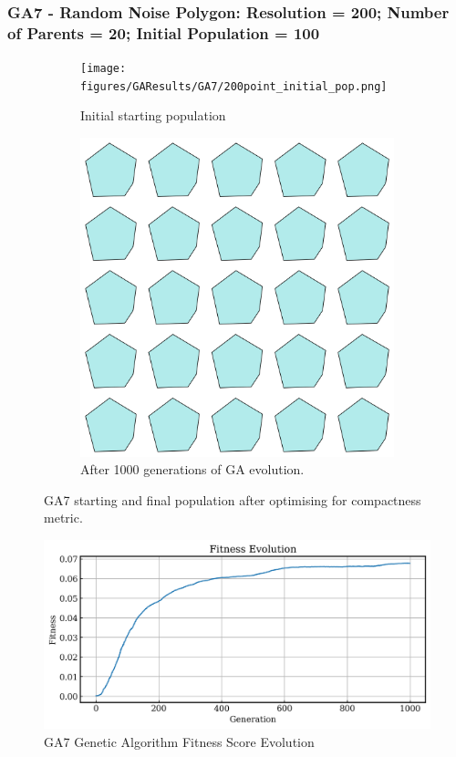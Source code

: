 \documentclass{article}
\begin{document}
\subsubsection*{GA7 - Random Noise Polygon: Resolution = 200; Number of Parents = 20; Initial Population = 100}

\begin{figure}[H]
    \centering
    \begin{subfigure}[b]{0.45\textwidth}
        \centering
        \texttt{[image: figures/GAResults/GA7/200point\_initial\_pop.png]}
        \caption{Initial starting population}
        \label{fig:GA7_starting}
    \end{subfigure}
    \hfill
    \begin{subfigure}[b]{0.45\textwidth}
        \centering
        \includegraphics[width=\textwidth]{figures/GAResults/GA7/1000gens_20pars_100initpop_5pcent_mut.png}
        \caption{After 1000 generations of GA evolution.}
        \label{fig:GA7_final}
    \end{subfigure}
    \caption{GA7 starting and final population after optimising for compactness metric.}
    \label{fig:GA7_before_after_GA}
\end{figure}

\begin{figure}[H]
    \centering
    \includegraphics[width=0.75\linewidth]{figures/GAResults/GA7/fitness_curve.png}
    \caption{GA7 Genetic Algorithm Fitness Score Evolution}
    \label{fig:GA7_fitness}
\end{figure}
\end{document}
